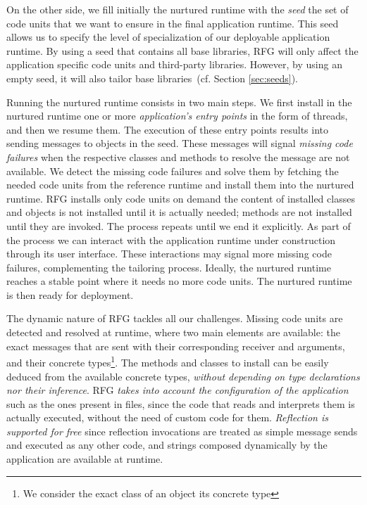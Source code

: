 On the other side, we fill initially the nurtured runtime with the \emph{seed} \ie the set of code units that we want to ensure in the final application runtime. This seed allows us to specify the level of specialization of our deployable application runtime.
By using a seed that contains all base libraries, RFG will only affect the application specific code units and third-party libraries.
However, by using an empty seed, it will also tailor base libraries~(cf. Section \ref{sec:seeds}).

Running the nurtured runtime consists in two main steps. We first install in the nurtured runtime one or more \emph{application's entry points} in the form of threads, and then we resume them.
The execution of these entry points results into sending messages to objects in the seed. These messages will signal \emph{missing code failures} when the respective classes and methods to resolve the message are not available.
We detect the missing code failures and solve them by fetching the needed code units from the reference runtime and install them into the nurtured runtime. RFG installs only code units on demand \ie the content of installed classes and objects is not installed until it is actually needed; methods are not installed until they are invoked.
The process repeats until we end it explicitly. As part of the process we can interact with the application runtime under construction through \eg its user interface. These interactions may signal more missing code failures, complementing the tailoring process. Ideally, the nurtured runtime reaches a stable point where it needs no more code units.
The nurtured runtime is then ready for deployment.

The dynamic nature of RFG tackles all our challenges. Missing code units are detected and resolved at runtime, where two main elements are available: the exact messages that are sent with their corresponding receiver and arguments, and their concrete types\footnote{We consider the exact class of an object its concrete type}. The methods and classes to install can be easily deduced from the available concrete types, \emph{without depending on type declarations nor their inference}. RFG \emph{takes into account the configuration of the application} such as the ones present in files, since the code that reads and interprets them is actually executed, without the need of custom code for them. \emph{Reflection is supported for free} since reflection invocations are treated as simple message sends and executed as any other code, and strings composed dynamically by the application are available at runtime. 


